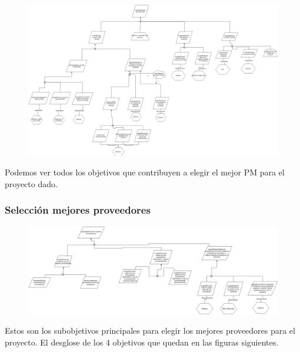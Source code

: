\begin{figure}[H]
    \centering
    \includegraphics[width=9.3in, keepaspectratio, angle=90]{imagenes/objetivos-seleccion-mejor-pm.png}
\end{figure}

Podemos ver todos los objetivos que contribuyen a elegir el mejor PM para el proyecto dado.

\subsubsection{Selección mejores proveedores}

\begin{figure}[H]
    \centering
    \includegraphics[width=9in, keepaspectratio, angle=90]{imagenes/objetivos-seleccion-mejor-proveedor-principal.png}
\end{figure}

Estos son los subobjetivos principales para elegir los mejores proveedores para el proyecto. El desglose de los 4 objetivos que quedan en las figuras siguientes.

